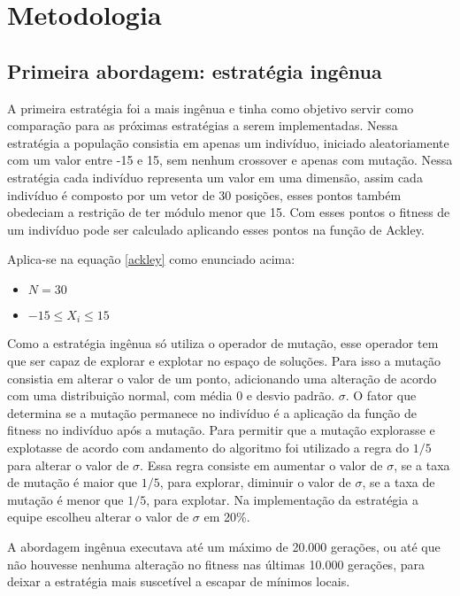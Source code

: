 \documentclass[
	article,			%
	11pt,				%
	oneside,			%
	a4paper,			%
	english,			%
	brazil,				%
	]{abntex2}
\begin{document}
\section{Metodologia}

\subsection{Primeira abordagem: estratégia ingênua}

A primeira estratégia foi a mais ingênua e tinha como objetivo servir como comparação para as próximas estratégias a serem implementadas. Nessa estratégia a população consistia em apenas um indivíduo, iniciado aleatoriamente com um valor entre -15 e 15, sem nenhum crossover e apenas com mutação. Nessa estratégia cada indivíduo representa um valor em uma dimensão, assim cada indivíduo é composto por um vetor de 30 posições, esses pontos também obedeciam a restrição de ter módulo menor que 15. Com esses pontos o fitness de um indivíduo pode ser calculado aplicando esses pontos na função de Ackley.

Aplica-se na equação \ref{ackley} como enunciado acima:
\begin{itemize}
      \item \(N = 30\)
      \item \(-15 \le X_i \le 15\)
\end{itemize}

Como a estratégia ingênua só utiliza o operador de mutação, esse operador tem que ser capaz de explorar e explotar no espaço de soluções. Para isso a mutação consistia em alterar o valor de um ponto, adicionando uma alteração de acordo com uma distribuição normal, com média 0 e desvio padrão.
$\sigma$. O fator que determina se a mutação permanece no indivíduo é a aplicação da função de fitness no indivíduo após a mutação. Para permitir que a mutação explorasse e explotasse de acordo com andamento do algoritmo foi utilizado a regra do $1/5$ para alterar o valor de $\sigma$. Essa regra consiste em aumentar o valor de $\sigma$, se a taxa de mutação é maior que $1/5$, para explorar, diminuir o valor de $\sigma$, se a taxa de mutação é menor que $1/5$, para explotar. Na implementação da estratégia a equipe escolheu alterar o valor de $\sigma$ em 20\%.
\par
A abordagem ingênua executava até um máximo de 20.000 gerações, ou até que não houvesse nenhuma alteração no fitness nas últimas 10.000 gerações, para deixar a estratégia mais suscetível a escapar de mínimos locais.
\end{document}
